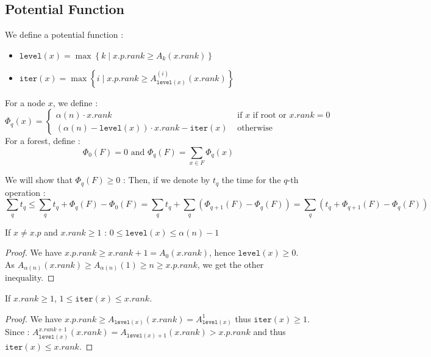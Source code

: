 \documentclass{cours}
\begin{document}
\subsection{Potential Function}
We define a potential function : 
\begin{definition}
    \begin{itemize}
        \item $\texttt{level}(x) = \max \left\{k \mid x.p.rank \geq A_{k}(x.rank)\right\}$
        \item $\texttt{iter}(x) = \max \left\{i \mid x.p.rank \geq A_{\texttt{level}(x)}^{(i)}(x.rank)\right\}$
    \end{itemize}
    For a node $x$, we define : 
    \[
        \Phi_{q}(x) = \begin{cases}
            \alpha(n)\cdot x.rank &\text{ if $x$ if root or } x.rank = 0\\
            \left(\alpha(n) - \texttt{level}(x)\right)  \cdot x.rank - \texttt{iter}(x) & \text{ otherwise}
        \end{cases}
    \]
    For a forest, define : 
    \[
        \Phi_{0}(F) = 0 \text{ and } \Phi_{q}(F) = \sum_{x \in F} \Phi_{q}(x)
    \]
\end{definition}

We will show that $\Phi_{q}(F) \geq 0$ : 
Then, if we denote by $t_{q}$ the time for the $q$-th operation : 
\[
    \sum_{q} t_{q} \leq \sum_{q} t_{q} + \Phi_{q}(F) - \Phi_{0}(F) = \sum_{q}t_{q} + \sum_{q}\left(\Phi_{q + 1}(F) - \Phi_{q}(F)\right) = \sum_{q}\left(t_{q} + \Phi_{q + 1}(F) - \Phi_{q}(F)\right)   
\]

\begin{lemma}
    If $x \neq x.p$ and $x.rank \geq 1$ : $0 \leq \texttt{level}(x) \leq \alpha(n) - 1$
\end{lemma}
\begin{proof}
    We have $x.p.rank \geq x.rank + 1 = A_{0}(x.rank)$, hence $\texttt{level}(x) \geq 0$.\\
    As $A_{\alpha(n)}(x.rank) \geq A_{\alpha(n)}(1) \geq n \geq x.p.rank$, we get the other inequality.
\end{proof}

\begin{lemma}
    If $x.rank \geq 1$, $1 \leq \texttt{iter}(x) \leq x.rank$.
\end{lemma}
\begin{proof}
    We have $x.p.rank \geq A_{\texttt{level}(x)}(x.rank) = A_{\texttt{level}(x)}^{1}$ thus $\texttt{iter}(x) \geq 1$.\\
    Since : $A_{\texttt{level}(x)}^{x.rank + 1}(x.rank) = A_{\texttt{level}(x) + 1}(x.rank) > x.p.rank$ and thus $\texttt{iter}(x) \leq x.rank$.
\end{proof}
\end{document}
